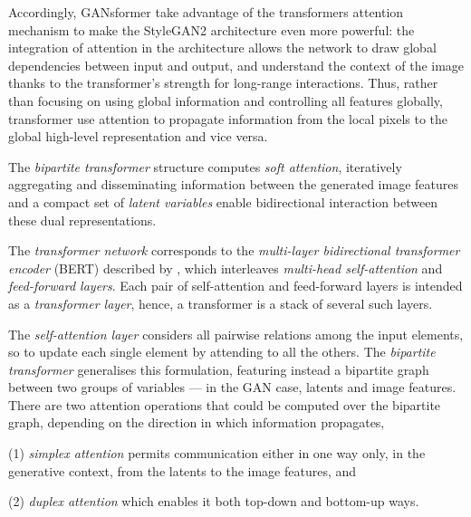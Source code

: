 \documentclass{article}
\begin{document}
	Accordingly, GANsformer take advantage of the transformers attention mechanism to make the 
	StyleGAN2 architecture even more powerful: the integration of attention in the architecture allows 
	the network to draw global dependencies between input and output, and understand the context of 
	the image thanks to the transformer's strength for long-range interactions.
	Thus, rather than focusing on using global information and controlling all features globally, 
	transformer use attention to propagate information from the local pixels to the global high-level 
	representation and vice versa. 
	
	The \textit{bipartite transformer} structure computes \textit{soft attention}, iteratively aggregating 
	and disseminating information between the generated image features and a compact set of 
	\textit{latent variables} enable bidirectional interaction between these dual representations. 
	
	The \textit{transformer network} corresponds to the \textit{multi-layer bidirectional transformer 
	encoder} (BERT) described by \citet{devlin2019bert}, which interleaves \textit{multi-head 
	self-attention} and \textit{feed-forward layers}.
	Each pair of self-attention and feed-forward layers is intended as a \textit{transformer layer}, hence, 
	a transformer is a stack of several such layers. 
	
	The \textit{self-attention layer} considers all pairwise relations among the input elements, so to 
	update each single element by attending to all the others. 
	The \textit{bipartite transformer} generalises this formulation, featuring instead a bipartite graph 
	between two groups of variables — in the GAN case, latents and image features. 
	There are two attention operations that could be computed over the bipartite graph, depending on 
	the direction in which information propagates, 
	\begin{enumerate*}
		\item [(1)] \textit{simplex attention} permits communication either in one way only, in the 
		generative context, from the latents to the image features, and
		\item [(2)] \textit{duplex attention} which enables it both top-down and bottom-up ways.
	\end{enumerate*}
	
\end{document}
